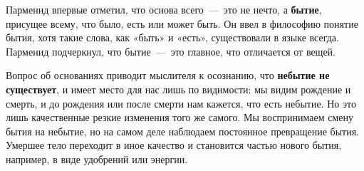 Парменид впервые отметил, что основа всего~---~это не нечто, а \textbf{бытие}, присущее всему, что было, есть или может быть. Он ввел в философию понятие бытия, хотя такие слова, как «быть» и «есть», существовали в языке всегда. Парменид подчеркнул, что бытие~---~это главное, что отличается от вещей.


Вопрос об основаниях приводит мыслителя к осознанию, что \textbf{небытие не существует}, и имеет место для нас лишь по видимости: мы видим рождение и смерть, и до рождения или после смерти нам кажется, что есть небытие. Но это лишь качественные резкие изменения того же самого. Мы воспринимаем смену бытия на небытие, но на самом деле наблюдаем постоянное превращение бытия. Умершее тело переходит в иное качество и становится частью нового бытия, например, в виде удобрений или энергии.


